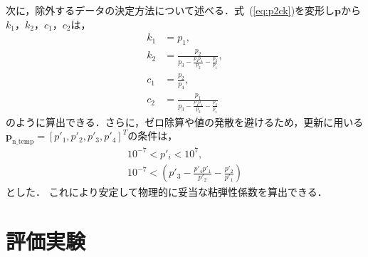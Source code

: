 \documentclass[a4paper]{jarticle}
\begin{document}
次に，除外するデータの決定方法について述べる．式~(\ref{eq:p2ck})を変形し$\mathbf{p}$から$k_1$，$k_2$，$c_1$，$c_2$は，
\begin{equation}
    \begin{aligned}
        k_1 &= p_1 ,\\
        k_2 &= \frac{p_2}{p_3 - \frac{p_4 p_1}{p_2} - \frac{p_2}{p_1}} ,\\
        c_1 &= \frac{p_2}{p_4},\\
        c_2 &= \frac{p_1}{p_3 - \frac{p_4 p_1}{p_2} - \frac{p_2}{p_1}} 
    \end{aligned}
\end{equation}
のように算出できる．さらに，ゼロ除算や値の発散を避けるため，更新に用いる$\mathbf{p}_{\mathrm{n\_temp}}=[p'_1,p'_2,p'_3,p'_4]^{T}$の条件は，
\begin{equation}
    \begin{aligned}
        10^{-7} < {p}'_{i} < 10^{7} ,\\
        10^{-7} < \left( p'_3 - \frac{p'_4 p'_1}{p'_2} - \frac{p'_2}{p'_1} \right)
    \end{aligned}
\end{equation}
とした．
これにより安定して物理的に妥当な粘弾性係数を算出できる．
\section{評価実験}
\end{document}
